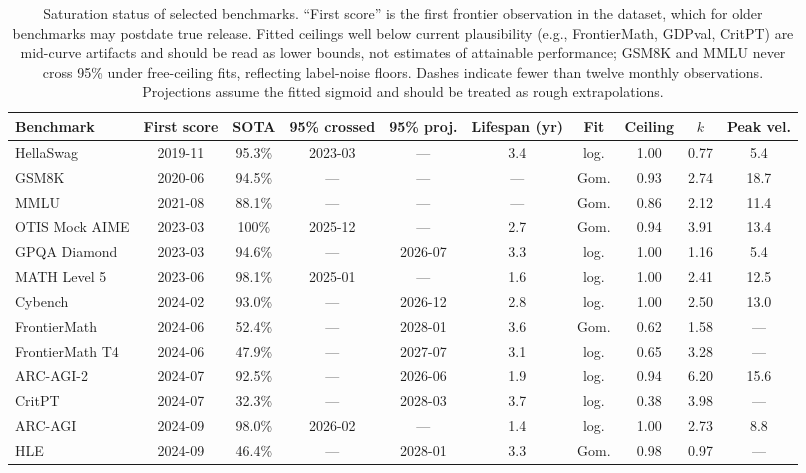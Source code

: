 \begin{table}[t]
\centering
\caption{Saturation status of selected benchmarks. ``First score'' is the first frontier observation in the dataset, which for older benchmarks may postdate true release. Fitted ceilings well below current plausibility (e.g., FrontierMath, GDPval, CritPT) are mid-curve artifacts and should be read as lower bounds, not estimates of attainable performance; GSM8K and MMLU never cross 95\% under free-ceiling fits, reflecting label-noise floors. Dashes indicate fewer than twelve monthly observations. Projections assume the fitted sigmoid and should be treated as rough extrapolations.}
\label{tab:benchmarks}
\small
\begin{tabular}{lccccccccc}
\toprule
Benchmark & First score & SOTA & 95\% crossed & 95\% proj. & Lifespan (yr) & Fit & Ceiling & $k$ & Peak vel. \\
\midrule
HellaSwag           & 2019-11 & 95.3\% & 2023-03 & ---     & 3.4 & log. & 1.00 & 0.77 & 5.4  \\
GSM8K               & 2020-06 & 94.5\% & ---     & ---     & --- & Gom. & 0.93 & 2.74 & 18.7 \\
MMLU                & 2021-08 & 88.1\% & ---     & ---     & --- & Gom. & 0.86 & 2.12 & 11.4 \\
OTIS Mock AIME      & 2023-03 & 100\%  & 2025-12 & ---     & 2.7 & Gom. & 0.94 & 3.91 & 13.4 \\
GPQA Diamond        & 2023-03 & 94.6\% & ---     & 2026-07 & 3.3 & log. & 1.00 & 1.16 & 5.4  \\
MATH Level 5        & 2023-06 & 98.1\% & 2025-01 & ---     & 1.6 & log. & 1.00 & 2.41 & 12.5 \\
Cybench             & 2024-02 & 93.0\% & ---     & 2026-12 & 2.8 & log. & 1.00 & 2.50 & 13.0 \\
FrontierMath        & 2024-06 & 52.4\% & ---     & 2028-01 & 3.6 & Gom. & 0.62 & 1.58 & ---  \\
FrontierMath T4     & 2024-06 & 47.9\% & ---     & 2027-07 & 3.1 & log. & 0.65 & 3.28 & ---  \\
ARC-AGI-2           & 2024-07 & 92.5\% & ---     & 2026-06 & 1.9 & log. & 0.94 & 6.20 & 15.6 \\
CritPT              & 2024-07 & 32.3\% & ---     & 2028-03 & 3.7 & log. & 0.38 & 3.98 & ---  \\
ARC-AGI             & 2024-09 & 98.0\% & 2026-02 & ---     & 1.4 & log. & 1.00 & 2.73 & 8.8  \\
HLE                 & 2024-09 & 46.4\% & ---     & 2028-01 & 3.3 & Gom. & 0.98 & 0.97 & ---  \\

\end{tabular}
\end{table}

